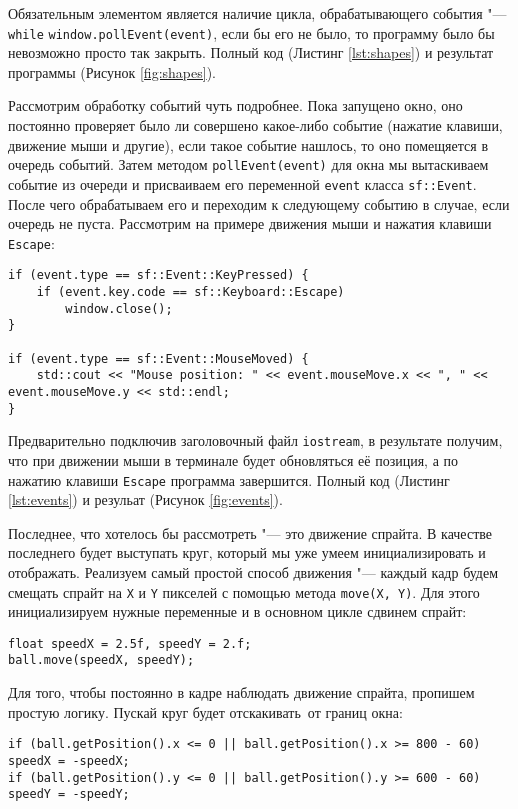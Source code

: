 Обязательным элементом является наличие цикла, обрабатывающего события "--- \texttt{\color{blue}while} \texttt{window.pollEvent(event)}, если бы его не было, то программу было бы невозможно просто так закрыть. Полный код (Листинг \ref{lst:shapes}) и результат программы (Рисунок \ref{fig:shapes}).

Рассмотрим обработку событий чуть подробнее. Пока запущено окно, оно постоянно проверяет было ли совершено какое-либо событие (нажатие клавиши, движение мыши и другие), если такое событие нашлось, то оно помещяется в очередь событий. Затем методом \texttt{pollEvent(event)} для окна мы вытаскиваем событие из очереди и присваиваем его переменной \texttt{event} класса \texttt{sf::Event}. После чего обрабатываем его и переходим к  следующему событию в случае, если очередь не пуста. Рассмотрим на примере движения мыши и нажатия клавиши \texttt{Escape}:

\begin{lstlisting}[style=myStyle]
if (event.type == sf::Event::KeyPressed) {
    if (event.key.code == sf::Keyboard::Escape)
        window.close();
}

if (event.type == sf::Event::MouseMoved) {
    std::cout << "Mouse position: " << event.mouseMove.x << ", " << event.mouseMove.y << std::endl;
}
\end{lstlisting}

Предварительно подключив заголовочный файл \texttt{iostream}, в результате получим, что при движении мыши в терминале будет обновляться её позиция, а по нажатию клавиши \texttt{Escape} программа завершится. Полный код (Листинг \ref{lst:events}) и резульат (Рисунок \ref{fig:events}).

Последнее, что хотелось бы рассмотреть "--- это движение спрайта. В качестве последнего будет выступать круг, который мы уже умеем инициализировать и отображать. Реализуем самый простой способ движения "--- каждый кадр будем смещать спрайт на \texttt{X} и \texttt{Y} пикселей с помощью метода \texttt{move(X, Y)}. Для этого инициализируем нужные переменные и в основном цикле сдвинем спрайт:

\begin{lstlisting}[style=myStyle]
float speedX = 2.5f, speedY = 2.f;
ball.move(speedX, speedY);
\end{lstlisting}

Для того, чтобы постоянно в кадре наблюдать движение спрайта, пропишем простую логику. Пускай круг будет \flqq отскакивать\frqq\ от границ окна:

\begin{lstlisting}[style=myStyle]
if (ball.getPosition().x <= 0 || ball.getPosition().x >= 800 - 60) speedX = -speedX;
if (ball.getPosition().y <= 0 || ball.getPosition().y >= 600 - 60) speedY = -speedY;
\end{lstlisting}

